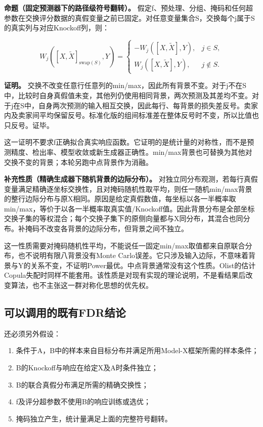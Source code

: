 \documentclass[UTF8,11pt,a4paper]{ctexart}
\providecommand{\tightlist}{\setlength{\itemsep}{0pt}\setlength{\parskip}{0pt}}
\begin{document}
\textbf{命题（固定预测器下的路径级符号翻转）。} 假定f、预处理、分组、掩码和任何超参数在交换评分数据的真假变量之前已固定。对任意变量集合S，交换每个j属于S的真实列与对应Knockoff列，则：

\[
W_j([X,\widetilde X]_{\mathrm{swap}(S)},Y)
=\begin{cases}
-W_j([X,\widetilde X],Y),&j\in S,\\
W_j([X,\widetilde X],Y),&j\notin S.
\end{cases}
\]

\textbf{证明。} 交换不改变任意行任意列的min/max，因此所有背景不变。对于j不在S中，比较时自身真假值未变，其他列仍使用相同背景，两次预测及其差均不变。对于j在S中，自身两次预测的输入相互交换，因此每行、每背景的损失差反号。卖家内及卖家间平均保留反号。标准化版的组间标准差在整体反号时不变，所以比值也只反号。证毕。

这一证明不要求f正确拟合真实响应函数。它证明的是统计量的对称性，而不是预测精度、检出率、模型收敛或新生成器正确性。min/max背景也可替换为其他对交换不变的背景；本轮另跑中点背景作为消融。

\textbf{补充性质（精确生成器下随机背景的边际分布）。} 对独立同分布观测，若每行真假变量满足精确逐坐标交换性，且对掩码随机性取平均，则任一随机min/max背景的整行边际分布与原X相同。原因是给定真假数值，每坐标以各一半概率取min/max，等价于以各一半概率取真实值/Knockoff值。因此背景分布是全部坐标交换子集的等权混合；每个交换子集下的原侧向量都与X同分布，其混合也同分布。补掩码不改变各背景的边际分布，但背景之间不独立。

这一性质需要对掩码随机性平均，不能说任一固定min/max取值都来自原联合分布，也不说明有限八背景没有Monte Carlo误差。它只涉及输入边际，不意味着背景与Y的关系不变，不证明Power最优。中点背景通常没有这个性质。Olist的估计Copula失配时同样不能套用。该性质是对现有实现的理论说明，不是看结果后改变算法，也不主张这一群对称化思想的优先权。

\subsection{可以调用的既有FDR结论}\label{ux53efux4ee5ux8c03ux7528ux7684ux65e2ux6709fdrux7ed3ux8bba}

还必须另外假设：

\begin{enumerate}
\def\labelenumi{\arabic{enumi}.}
\tightlist
\item
  条件于A，B中的样本来自目标分布并满足所用Model-X框架所需的样本条件；
\item
  B的Knockoff与响应在给定X及A时条件独立；
\item
  B的联合真假分布满足所需的精确交换性；
\item
  f及评分超参数不使用B的响应训练或选优；
\item
  掩码独立产生，统计量满足上面的完整符号翻转。
\end{enumerate}
\end{document}
